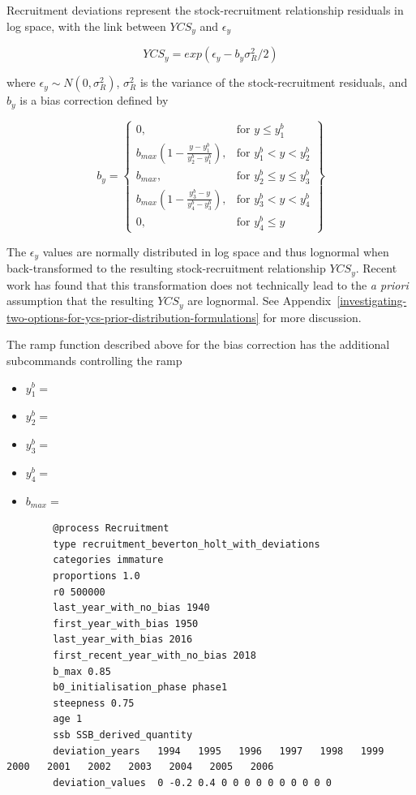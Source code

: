 Recruitment deviations represent the stock-recruitment relationship residuals in log space, with the link between $YCS_y$ and $\epsilon_y$

\begin{equation}\label{eq:recruit_devs}
	YCS_y = exp(\epsilon_y - b_y\sigma^2_R / 2)
\end{equation}

where $\epsilon_y\sim N(0,\sigma^2_R)$, $\sigma^2_R$ is the variance of the stock-recruitment residuals, and $b_y$ is a bias correction defined by \cite{methot2011adjusting}

\begin{equation}\label{eq::bias}
b_y = \left\{\begin{array}{lr}
0, & \text{for }y\leq y_1^b\\
b_{max}(1 - \frac{y - y_1^b}{y_2^b - y_1^b}), & \text{for } y_1^b < y < y_2^b\\
b_{max}, & \text{for } y_2^b\leq y \leq y_3^b\\
b_{max}(1 - \frac{y_3^b - y}{y_4^b - y_3^b}), & \text{for }  y_3^b< y < y_4^b\\
0, & \text{for } y_4^b\leq y
\end{array}\right\}
\end{equation}

The $\epsilon_y$ values are normally distributed in log space and thus lognormal when back-transformed to the resulting stock-recruitment relationship $YCS_y$. Recent work has found that this transformation does not technically lead to the \textit{a priori} assumption that the resulting $YCS_y$ are lognormal. See Appendix~\ref{investigating-two-options-for-ycs-prior-distribution-formulations} for more discussion.

The ramp function described above for the bias correction has the additional subcommands controlling the ramp

\begin{itemize}
	\item $y_1^b = $ 
	\item $y_2^b = $ 
	\item $y_3^b = $ 
	\item $y_4^b = $ 
	\item $b_{max} = $ 
\end{itemize}

{\small{\begin{verbatim}
		@process Recruitment
		type recruitment_beverton_holt_with_deviations
		categories immature
		proportions 1.0
		r0 500000
		last_year_with_no_bias 1940
		first_year_with_bias 1950
		last_year_with_bias 2016
		first_recent_year_with_no_bias 2018
		b_max 0.85
		b0_initialisation_phase phase1
		steepness 0.75
		age 1
		ssb SSB_derived_quantity
		deviation_years   1994   1995   1996   1997   1998   1999   2000   2001   2002   2003   2004   2005   2006
		deviation_values  0 -0.2 0.4 0 0 0 0 0 0 0 0 0 0
\end{verbatim}}}

